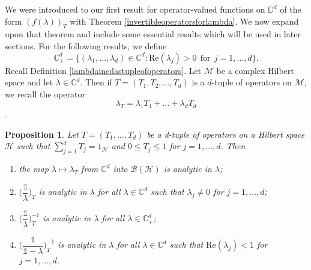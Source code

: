 \documentclass[11pt, reqno]{amsart}
\newtheorem{proposition}[theorem]{Proposition}
\newcommand\1{\boldsymbol {1}}
\numberwithin{equation}{section}
\begin{document}
We were introduced to our first result for operator-valued functions on $\mathbb{D}^{d}$ of the form $(f(\lambda))_{T}$ with Theorem \ref{invertibleoperatorsforlambda}. We now expand upon that theorem and include some essential results which will be used in later sections. For the following results, we define 
$$\mathbb{C}_{+}^{d} = \big\{(\lambda_{1},\hdots,\lambda_{d})\in\mathbb{C}^{d} : \mathrm{Re}(\lambda_{j})>0~~\text{for}~~j=1,\hdots,d\big\}.$$
Recall Definition \ref{lambdaincdastupleofoperators}. Let $\mathcal{M}$ be a complex Hilbert space and let $\lambda\in\mathbb{C}^{d}$. Then if $T=(T_{1},T_{2},\hdots,T_{d})$ is a $d$-tuple of operators on $\mathcal{M}$, we recall the operator 
\begin{equation}\label{lambdaXequation}
    \lambda_{T}=\lambda_{1}T_{1}+\hdots+\lambda_{d}T_{d}
\end{equation}.
\begin{proposition}\label{propforIbeinganalytic}
Let $T=(T_{1},\hdots, T_{d})$ be a d-tuple of operators on a Hilbert space $\mathcal{H}$ such that $\sum_{j=1}^{d}T_{j}=1_{\mathcal{H}}$ and $0\leq T_{j}\leq 1$ for $j=1,\hdots, d$. Then
\begin{enumerate}
    \item the map $\lambda\mapsto\lambda_{T}$ from $\mathbb{C}^{d}$ into $\mathcal{B}(\mathcal{H})$ is analytic in $\lambda$;\label{this}
    \item $\bigg(\dfrac{\mathds{1}}{\lambda}\bigg)_{T}$ is analytic in $\lambda$ for all $\lambda\in\mathbb{C}^{d}$ such that $\lambda_{j}\neq 0$ for $j=1,\hdots,d$;
    \item $\bigg(\dfrac{\mathds{1}}{\lambda}\bigg)^{-1}_{T}$ is analytic  in $\lambda$ for all $\lambda\in\mathbb{C}^{d}_{+}$;
    \item $\bigg(\dfrac{\mathds{1}}{\mathds{1}-\lambda}\bigg)^{-1}_{T}$ is analytic  in $\lambda$ for all $\lambda\in\mathbb{C}^{d}$ such that $\mathrm{Re}(\lambda_{j})<1$ for $j=1,\hdots,d$.
\end{enumerate}
\end{proposition}
\end{document}
